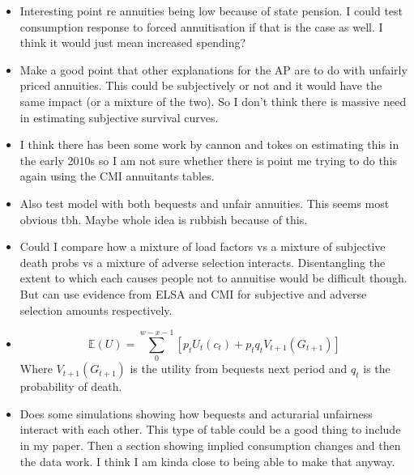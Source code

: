 \documentclass[12pt]{article}
\begin{document}
\begin{itemize}
      \item Interesting point re annuities being low because of state pension.
            I could test consumption response to forced annuitisation if that is the
            case as well. I think it would just mean increased spending?

      \item Make a good point that other explanations for the AP are to do with unfairly priced
            annuities. This could be subjectively or not and it would have the same impact (or
            a mixture of the two). So I don't think there is massive need in estimating subjective
            survival curves.

      \item I think there has been some work by cannon and tokes on estimating this in the
            early 2010s so I am not sure whether there is point me trying to do this again using the
            CMI annuitants tables.

      \item Also test model with both bequests and unfair annuities. This seems most obvious tbh.
            Maybe whole idea is rubbish because of this.

      \item Could I compare how a mixture of load factors vs a mixture of subjective death probs
            vs a mixture of adverse selection interacts. Disentangling the extent to which each causes
            people not to annuitise would be difficult though. But can use evidence from ELSA and CMI for
            subjective and adverse selection amounts respectively.

      \item \begin{equation*}
                  \mathbb{E}(U) = \sum_{0}^{w - x - 1}[p_{t}U_{t}(c_{t}) + p_{t}q_{t}V_{t+1}(G_{t+1})]
            \end{equation*}
            Where $V_{t+1}(G_{t+1})$ is the utility from bequests next period and $q_{t}$ is the probability of death.


      \item Does some simulations showing how bequests and acturarial unfairness interact with each other.
            This type of table could be a good thing to include in my paper. Then a section showing implied consumption
            changes and then the data work. I think I am kinda close to being able to make that anyway.


\end{itemize}
\end{document}
